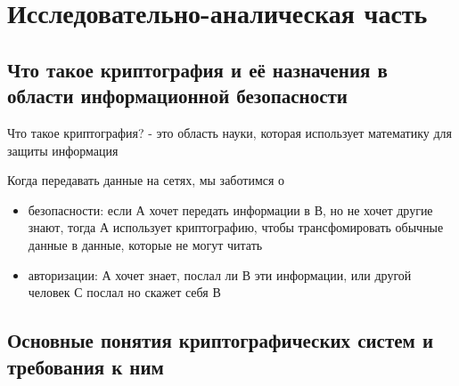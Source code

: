 \section{Исследовательно-аналическая часть}
\subsection{Что такое криптография и её назначения в области информационной безопасности}

Что такое криптография? - это область науки, которая использует математику для защиты информация

Когда передавать данные на сетях, мы заботимся о
\begin{itemize}
    \item безопасности: если А хочет передать информации в В, но не хочет другие знают, тогда А использует криптографию, чтобы трансфомировать обычные данные в данные, которые не могут читать
    \item авторизации: А хочет знает, послал ли В эти информации, или другой человек С послал но скажет себя В
\end{itemize}
\subsection{Основные понятия криптографических систем и требования к ним}
    
